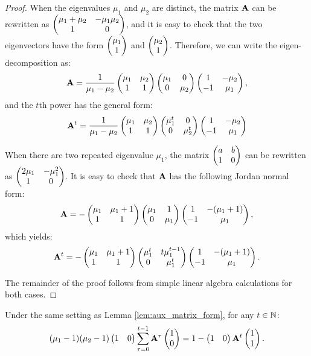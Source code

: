 \begin{proof}
When the eigenvalues $\mu_1$ and $\mu_2$ are distinct, the matrix $\mathbf{A}$ 
can be rewritten as $\begin{pmatrix} \mu_1+\mu_2 & -\mu_1\mu_2 \\ 1 & 0  \end{pmatrix}$, and it 
is easy to check  that the two eigenvectors have the form 
$\begin{pmatrix} \mu_1 \\ 1 \end{pmatrix}$ and $\begin{pmatrix} \mu_2 \\ 1 \end{pmatrix}$. Therefore, we can 
write the eigen-decomposition as:
\begin{equation*}
\mathbf{A} = \frac{1}{\mu_1 - \mu_2} \begin{pmatrix} \mu_1 & \mu_2 \\1 & 1 \end{pmatrix}
\begin{pmatrix} \mu_1 & 0 \\ 0 & \mu_2 \end{pmatrix}
\begin{pmatrix} 1 & -\mu_2 \\ -1 & \mu_1  \end{pmatrix},
\end{equation*}
and the $t$th power has the general form:
\begin{equation*}
\mathbf{A}^t = \frac{1}{\mu_1 - \mu_2} \begin{pmatrix} \mu_1 & \mu_2 \\1 & 1 \end{pmatrix}
\begin{pmatrix} \mu_1^t & 0 \\ 0 & \mu_2^t \end{pmatrix}
\begin{pmatrix} 1 & -\mu_2 \\ -1 & \mu_1  \end{pmatrix}
\end{equation*}

When there are two repeated eigenvalue $\mu_1$, the matrix 
$\begin{pmatrix} a & b \\ 1 & 0 \end{pmatrix}$ can be rewritten as $\begin{pmatrix} 
2\mu_1 & -\mu_1^2 \\ 1 & 0 
 \end{pmatrix}$. It is easy to check that $\mathbf{A}$ has the following Jordan normal form:
\begin{equation*}
\mathbf{A} = - \begin{pmatrix} \mu_1 & \mu_1+1 \\1 & 1 \end{pmatrix}\begin{pmatrix} \mu_1 & 1 \\0 & \mu_1 \end{pmatrix}
\begin{pmatrix} 1 & -(\mu_1 + 1) \\-1 & \mu_1 \end{pmatrix},
\end{equation*}
which yields:
\begin{equation*}
\mathbf{A}^t = - \begin{pmatrix} \mu_1 & \mu_1+1 \\1 & 1 \end{pmatrix}
\begin{pmatrix} \mu^t_1 & t\mu_1^{t-1} \\0 & \mu^t_1 \end{pmatrix}
\begin{pmatrix} 1 & -(\mu_1 + 1) \\-1 & \mu_1 \end{pmatrix}.
\end{equation*}

The remainder of the proof follows from simple linear algebra 
calculations for both cases.
\end{proof}

\begin{lemma}\label{lem:aux_matrix_equality}
Under the same setting as Lemma \ref{lem:aux_matrix_form}, for any $t\in \mathbb{N}$: 
\begin{equation*}
(\mu_1 - 1)(\mu_2 - 1)
\begin{pmatrix} 1 & 0 \end{pmatrix} \sum_{\tau = 0}^{t-1} \mathbf{A}^\tau \begin{pmatrix} 1 \\ 0 \end{pmatrix}
 = 1 - \begin{pmatrix} 1 & 0 \end{pmatrix}  \mathbf{A}^t \begin{pmatrix} 1 \\ 1 \end{pmatrix}.
\end{equation*}
\end{lemma}


